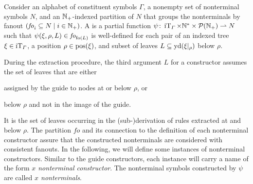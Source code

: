 \documentclass[../../document.tex]{subfiles}
\begin{document}
    \begin{definition}
        Consider an alphabet of constituent symbols \(\varGamma\), a nonempty set of nonterminal symbols \(N\), and an \(\mathbb{N}_+\)-indexed partition of \(N\) that groups the nonterminals by fanout \((\mathit{fo}_i \subseteq N \mid i \in \mathbb{N}_+)\).
        A  is a partial function \(\psi\colon \operatorname{iT}_\varGamma \times \mathbb{N}^* \times \mathcal{P}(\mathbb{N}_+) \rightharpoonup N\) such that \(\psi(\xi, \rho, L) \in \mathit{fo}_{\operatorname{fo}(L)}\) is well-defined for each pair of an indexed tree \(\xi \in \operatorname{iT}_\varGamma\), a position \(\rho \in \operatorname{pos}(\xi)\), and subset of leaves \(L \subseteq \operatorname{yd}(\xi|_\rho)\) below \(\rho\).
    \end{definition}


    During the extraction procedure, the third argument \(L\) for a constructor assumes the set of leaves that are either
    \begin{inparaenum}
        \item assigned by the guide to nodes at or below \(\rho\), or
        \item below \(\rho\) and not in the image of the guide.
    \end{inparaenum}
    It is the set of leaves occurring in the (sub-)derivation of rules extracted at and below \(\rho\).
    The partition \(\mathit{fo}\) and its connection to the definition of each nonterminal constructor assure that the constructed nonterminals are considered with consistent fanouts.
    In the following, we will define some instances of nonterminal constructors.
    Similar to the guide constructors, each instance will carry a name of the form \emph{\(x\) nonterminal constructor}.
    The nonterminal symbols constructed by \(\psi\) are called \emph{\(x\) nonterminals}.
\end{document}
